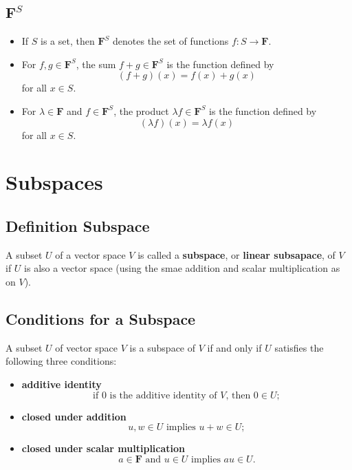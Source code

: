 \documentclass{article}
\begin{document}
	\subsection{$\mathbf{F}^S$}
	\begin{itemize}
		\item If $S$ is a set, then $\mathbf{F}^S$ denotes the set of functions $f:S\to\mathbf{F}$.
		\item For $f,g\in\mathbf{F}^S$, the sum $f + g\in\mathbf{F}^S$ is the function defined by
		\begin{equation*}
			(f + g)(x) = f(x) + g(x)
		\end{equation*}
		for all $x\in S$.
		\item For $\lambda\in\mathbf{F}$ and $f\in\mathbf{F}^S$, the product $\lambda f\in\mathbf{F}^S$ is the function defined by
		\begin{equation*}
			(\lambda f)(x) = \lambda f(x)
		\end{equation*}
		for all $x\in S$.
	\end{itemize}

	\section{Subspaces}
	\subsection{Definition Subspace}
	A subset $U$ of a vector space $V$ is called a \textbf{subspace}, or \textbf{linear subsapace}, of $V$ if $U$ is also a vector space (using the smae addition and scalar multiplication as on $V$).

	\subsection{Conditions for a Subspace}
	A subset $U$ of vector space $V$ is a subspace of $V$ if and only if $U$ satisfies the following three conditions:
	\begin{itemize}
		\item\textbf{additive identity}
		\begin{equation*}
			\text{if } 0 \text{ is the additive identity of } V \text{, then } 0\in U;
		\end{equation*}
		\item\textbf{closed under addition}
		\begin{equation*}
			u,w\in U \text{ implies } u+ w \in U;
		\end{equation*}
		\item\textbf{closed under scalar multiplication}
		\begin{equation*}
			a\in\mathbf{F} \text{ and } u \in U \text{ implies } au\in U.
		\end{equation*}
	\end{itemize}
\end{document}
